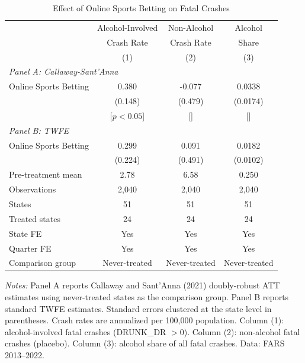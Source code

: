 \begin{table}[t]
\centering
\caption{Effect of Online Sports Betting on Fatal Crashes}
\label{tab:main}
\small
\begin{tabular}{lccc}
\hline\hline
 & \multicolumn{1}{c}{Alcohol-Involved} & \multicolumn{1}{c}{Non-Alcohol} & \multicolumn{1}{c}{Alcohol} \\
 & \multicolumn{1}{c}{Crash Rate} & \multicolumn{1}{c}{Crash Rate} & \multicolumn{1}{c}{Share} \\
 & (1) & (2) & (3) \\
\hline
\multicolumn{4}{l}{\textit{Panel A: Callaway-Sant'Anna}} \\
Online Sports Betting & 0.380 & -0.077 & 0.0338 \\
 & (0.148) & (0.479) & (0.0174) \\
 & [$p < 0.05$] & [] & [] \\
[0.5em]
\multicolumn{4}{l}{\textit{Panel B: TWFE}} \\
Online Sports Betting & 0.299 & 0.091 & 0.0182 \\
 & (0.224) & (0.491) & (0.0102) \\
\hline
Pre-treatment mean & 2.78 & 6.58 & 0.250 \\
Observations & 2,040 & 2,040 & 2,040 \\
States & 51 & 51 & 51 \\
Treated states & 24 & 24 & 24 \\
State FE & Yes & Yes & Yes \\
Quarter FE & Yes & Yes & Yes \\
Comparison group & Never-treated & Never-treated & Never-treated \\
\hline\hline
\end{tabular}
\begin{tablenotes}
\item \textit{Notes:} Panel A reports Callaway and Sant'Anna (2021) doubly-robust ATT estimates using never-treated states as the comparison group. Panel B reports standard TWFE estimates. Standard errors clustered at the state level in parentheses. Crash rates are annualized per 100,000 population. Column (1): alcohol-involved fatal crashes (DRUNK\_DR $> 0$). Column (2): non-alcohol fatal crashes (placebo). Column (3): alcohol share of all fatal crashes. Data: FARS 2013--2022.
\end{tablenotes}
\end{table}
